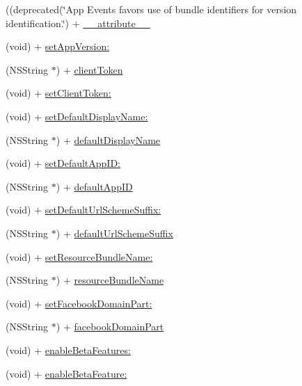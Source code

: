 \begin{DoxyCompactItemize}
\item 
((deprecated(\char`\"{}App Events favors use of bundle identifiers for version identification.\char`\"{}) + \hyperlink{interfaceFBSettings_a2e999eddc513423b7071f27bc09589aa}{\+\_\+\+\_\+attribute\+\_\+\+\_\+}
\item 
(void) + \hyperlink{interfaceFBSettings_a01b8ded28d0bc4e050ff6eccb9a03383}{set\+App\+Version\+:}
\item 
(N\+S\+String $\ast$) + \hyperlink{interfaceFBSettings_afa1e8342398ddbdd7e6e9cd0a28094ac}{client\+Token}
\item 
(void) + \hyperlink{interfaceFBSettings_a07cfc161668c190bf5fd37934821c4de}{set\+Client\+Token\+:}
\item 
(void) + \hyperlink{interfaceFBSettings_a783ff4cf8b998eadfbfe2d95efef24a1}{set\+Default\+Display\+Name\+:}
\item 
(N\+S\+String $\ast$) + \hyperlink{interfaceFBSettings_a64b1fe4c26086a1a2bb5b162815f2786}{default\+Display\+Name}
\item 
(void) + \hyperlink{interfaceFBSettings_aae75641f83b1caf710efd2ce72b6eb67}{set\+Default\+App\+I\+D\+:}
\item 
(N\+S\+String $\ast$) + \hyperlink{interfaceFBSettings_af60cce044316df28d128d64e79a77ba5}{default\+App\+ID}
\item 
(void) + \hyperlink{interfaceFBSettings_a08a9504a71c1c9ec329e97da7c636337}{set\+Default\+Url\+Scheme\+Suffix\+:}
\item 
(N\+S\+String $\ast$) + \hyperlink{interfaceFBSettings_ae7709bddfea2d7cf28ad5e91f769dc9b}{default\+Url\+Scheme\+Suffix}
\item 
(void) + \hyperlink{interfaceFBSettings_a60a15470e22d07ad1c7d4a789712e3c1}{set\+Resource\+Bundle\+Name\+:}
\item 
(N\+S\+String $\ast$) + \hyperlink{interfaceFBSettings_ad87ff4e3c9577a22d9a329b12137f976}{resource\+Bundle\+Name}
\item 
(void) + \hyperlink{interfaceFBSettings_a4cfd61825c72f8a5978cb07ba84983d1}{set\+Facebook\+Domain\+Part\+:}
\item 
(N\+S\+String $\ast$) + \hyperlink{interfaceFBSettings_a7ce923f25dd500f81ce518e998bf2f39}{facebook\+Domain\+Part}
\item 
(void) + \hyperlink{interfaceFBSettings_a9ce6bc977fc54c59ba5cacf56922ccac}{enable\+Beta\+Features\+:}
\item 
(void) + \hyperlink{interfaceFBSettings_a390b436e1de87f3d49979a6aa98e14b1}{enable\+Beta\+Feature\+:}
\item 

\end{DoxyCompactItemize}

